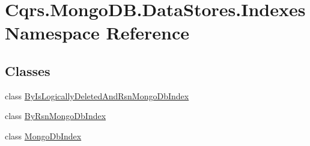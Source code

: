 \hypertarget{namespaceCqrs_1_1MongoDB_1_1DataStores_1_1Indexes}{}\section{Cqrs.\+Mongo\+D\+B.\+Data\+Stores.\+Indexes Namespace Reference}
\label{namespaceCqrs_1_1MongoDB_1_1DataStores_1_1Indexes}
\subsection*{Classes}
\begin{DoxyCompactItemize}
\item 
class \hyperlink{classCqrs_1_1MongoDB_1_1DataStores_1_1Indexes_1_1ByIsLogicallyDeletedAndRsnMongoDbIndex}{By\+Is\+Logically\+Deleted\+And\+Rsn\+Mongo\+Db\+Index}
\item 
class \hyperlink{classCqrs_1_1MongoDB_1_1DataStores_1_1Indexes_1_1ByRsnMongoDbIndex}{By\+Rsn\+Mongo\+Db\+Index}
\item 
class \hyperlink{classCqrs_1_1MongoDB_1_1DataStores_1_1Indexes_1_1MongoDbIndex}{Mongo\+Db\+Index}
\end{DoxyCompactItemize}
